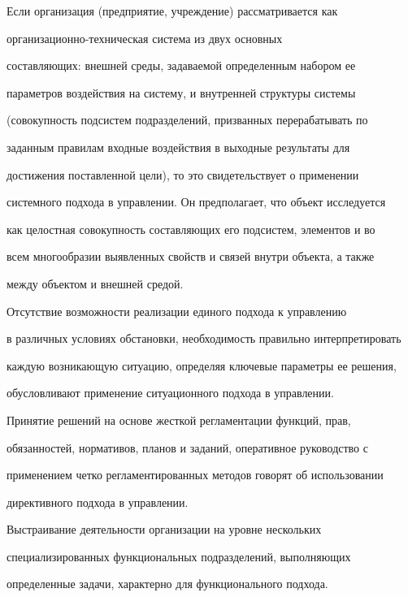        Если организация (предприятие, учреждение)  рассматривается как 


орга\-ни\-за\-ци\-он\-но-тех\-ни\-че\-ская сис\-те\-ма из двух основных 


составляющих: внешней среды, задаваемой определенным набором ее 


параметров воздействия на сис\-те\-му, и внут\-рен\-ней структуры сис\-те\-мы 


(совокупность подсистем подразделений, призванных перерабатывать по 


заданным правилам входные воздействия  в выходные результаты для 


достижения поставленной цели), то это свидетельствует о применении 


системного подхода в управлении. Он предполагает, что объект исследуется 


как целостная совокупность составляющих его подсистем, элементов и во 


всем многообразии выявленных свойств и связей внутри объекта, а также 


между объектом и внешней средой. 


       


       Отсутствие возможности реализации единого подхода к управлению 


в различных условиях обстановки, необходимость правильно интерпретировать 


каждую возникающую ситуацию, определяя ключевые параметры ее решения, 


обуслов\-ли\-ва\-ют применение  ситуационного подхода в управ\-лении. 


       


       Принятие решений на основе жесткой регламентации функций, прав, 


обязанностей, нормативов, планов и заданий, оперативное руководство с 


применением четко регламентированных методов говорят об использовании 


директивного подхода в управ\-лении. 


       


       Выстраивание деятельности организации на уровне нескольких 


специализированных функциональных подразделений, выполняющих 


определенные задачи, характерно для функционального подхода.  


